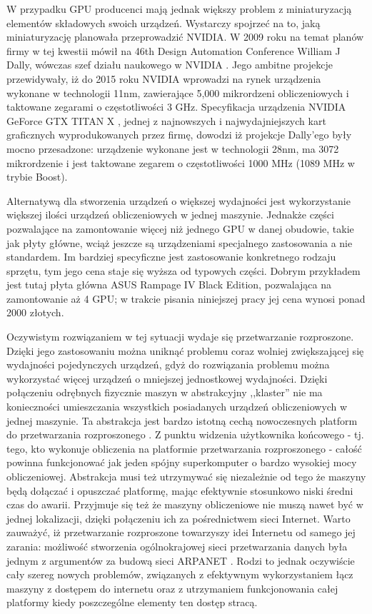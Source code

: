 \documentclass[12pt,a4paper,twoside]{article}
\begin{document}
W przypadku GPU producenci mają jednak większy problem z miniaturyzacją elementów składowych swoich urządzeń. Wystarczy spojrzeć na to, jaką miniaturyzację planowała przeprowadzić NVIDIA. W 2009 roku na temat planów firmy w tej kwestii mówił na 46th Design Automation Conference William J Dally, wówczas szef działu naukowego w NVIDIA \cite{nvidia2009}. Jego ambitne projekcje przewidywały, iż do 2015 roku NVIDIA wprowadzi na rynek urządzenia wykonane w technologii 11nm, zawierające 5,000 mikrordzeni obliczeniowych i taktowane zegarami o częstotliwości 3 GHz. Specyfikacja urządzenia NVIDIA GeForce GTX TITAN X \cite{nvidia2015}, jednej z najnowszych i najwydajniejszych kart graficznych  wyprodukowanych przez firmę, dowodzi iż projekcje Dally'ego były mocno przesadzone: urządzenie wykonane jest w technologii 28nm, ma 3072 mikrordzenie i jest taktowane zegarem o częstotliwości 1000 MHz (1089 MHz w trybie Boost).

Alternatywą dla stworzenia urządzeń o większej wydajności jest wykorzystanie większej ilości urządzeń obliczeniowych w jednej maszynie. Jednakże części pozwalające na zamontowanie więcej niż jednego GPU w danej obudowie, takie jak płyty główne, wciąż jeszcze są urządzeniami specjalnego zastosowania a nie standardem. Im bardziej specyficzne jest zastosowanie konkretnego rodzaju sprzętu, tym jego cena staje się wyższa od typowych części. Dobrym przykładem jest tutaj płyta główna ASUS Rampage IV Black Edition, pozwalająca na zamontowanie aż 4 GPU; w trakcie pisania niniejszej pracy jej cena wynosi ponad 2000 złotych.

Oczywistym rozwiązaniem w tej sytuacji wydaje się przetwarzanie rozproszone. Dzięki jego zastosowaniu można uniknąć problemu coraz wolniej zwiększającej się wydajności pojedynczych urządzeń, gdyż do rozwiązania problemu można wykorzystać więcej urządzeń o mniejszej jednostkowej wydajności. Dzięki połączeniu odrębnych fizycznie maszyn w abstrakcyjny ,,klaster'' nie ma konieczności umieszczania wszystkich posiadanych urządzeń obliczeniowych w jednej maszynie. Ta abstrakcja jest bardzo istotną cechą nowoczesnych platform do przetwarzania rozproszonego \cite{gridservices}. Z punktu widzenia użytkownika końcowego - tj. tego, kto wykonuje obliczenia na platformie przetwarzania rozproszonego - całość powinna funkcjonować jak jeden spójny superkomputer o bardzo wysokiej mocy obliczeniowej. Abstrakcja musi też utrzymywać się niezależnie od tego że maszyny będą dołączać i opuszczać platformę, mając efektywnie stosunkowo niski średni czas do awarii. Przyjmuje się też że maszyny obliczeniowe nie muszą nawet być w jednej lokalizacji, dzięki połączeniu ich za pośrednictwem sieci Internet. Warto zauważyć, iż przetwarzanie rozproszone towarzyszy idei Internetu od samego jej zarania: możliwość stworzenia ogólnokrajowej sieci przetwarzania danych była jednym z argumentów za budową sieci ARPANET \cite{arpanet}. Rodzi to jednak oczywiście cały szereg nowych problemów, związanych z efektywnym wykorzystaniem łącz maszyny z dostępem do internetu oraz z utrzymaniem funkcjonowania całej platformy kiedy poszczególne elementy ten dostęp stracą.
\end{document}
